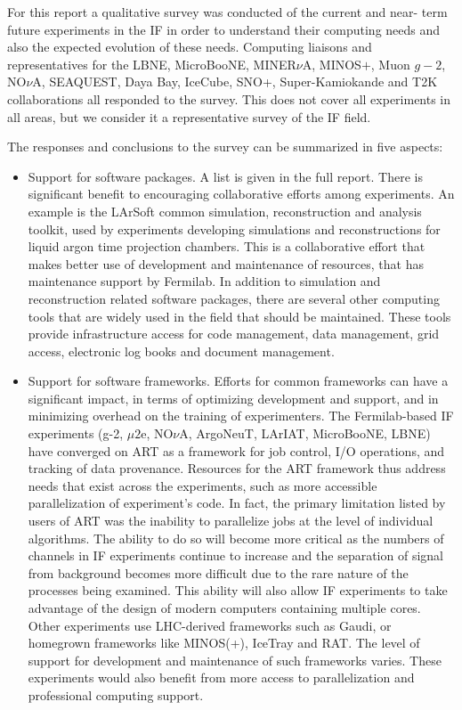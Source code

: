 For this report a qualitative survey was conducted of the current and near-
term future experiments in the IF in order to understand their computing needs
and also the expected evolution of these needs.  Computing liaisons and
representatives for the LBNE, MicroBooNE, MINER$\nu$A, MINOS$+$, Muon $g-2$,
NO$\nu$A, SEAQUEST,  Daya Bay, IceCube, SNO+, Super-Kamiokande and T2K
collaborations all responded to the survey. This does not cover all
experiments in all areas, but we consider it a representative survey of the IF
field.

The responses and conclusions to the survey can be summarized in five aspects:  

\begin{itemize} 
\item Support for software packages. A list is given in the
full report. There is significant benefit to encouraging collaborative efforts
among experiments. An example is the LArSoft common simulation,
reconstruction and analysis toolkit, used by experiments developing
simulations and reconstructions for liquid argon time projection chambers.
This is a collaborative effort that makes better use of development and
maintenance of resources, that has maintenance support by Fermilab.  In
addition to simulation and reconstruction related software packages, there are
several other computing tools that are widely used in the field that should be
maintained.  These tools provide infrastructure access for code management,
data management, grid access, electronic log books and document management.

\item Support for software frameworks. Efforts for common frameworks can have
a significant impact, in terms of optimizing  development and support, and in
minimizing overhead on the training of experimenters.  The Fermilab-based IF
experiments (g-2, $\mu2$e, NO$\nu$A, ArgoNeuT, LArIAT, MicroBooNE, LBNE) have
converged on ART as a framework for job control, I/O operations, and tracking
of data provenance. Resources for the ART framework thus address needs that
exist across the experiments, such as more accessible parallelization of
experiment's code. In fact, the primary limitation listed by users of ART was
the inability to parallelize jobs at the level of individual algorithms.  The
ability to do so will become more critical as the numbers of channels in IF
experiments continue to increase and the separation of signal from background
becomes more difficult due to the rare nature of the processes being examined.
This ability will also allow IF experiments to take advantage of the design of
modern computers containing multiple cores. Other experiments use LHC-derived
frameworks such as Gaudi, or homegrown frameworks like MINOS(+), IceTray and
RAT. The level of support for development and maintenance of such frameworks
varies. These experiments would also benefit from more access to
parallelization and professional computing support.


\end{itemize}
